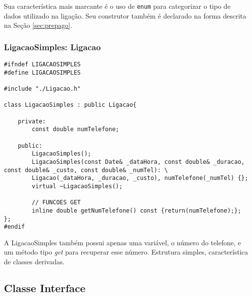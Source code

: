 Sua característica mais marcante é o uso de \texttt{enum} para categorizar o tipo de dados utilizado na ligação. Seu construtor também é declarado na forma descrita na Seção \ref{sec:prepago}. 

\subsubsection{LigacaoSimples: Ligacao} \label{sec:ligacaosimples}

\begin{lstlisting}[basicstyle=\tiny]
#ifndef LIGACAOSIMPLES
#define LIGACAOSIMPLES

#include "./Ligacao.h"

class LigacaoSimples : public Ligacao{

	private:   
		const double numTelefone;

	public:
		LigacaoSimples();
		LigacaoSimples(const Date& _dataHora, const double& _duracao, const double& _custo, const double& _numTel): \
		Ligacao(_dataHora, _duracao, _custo), numTelefone(_numTel) {};
		virtual ~LigacaoSimples();
		
		// FUNCOES GET
		inline double getNumTelefone() const {return(numTelefone);};
};
#endif
\end{lstlisting}

A LigacaoSimples também possui apenas uma variável, o número do telefone, e um método tipo \textit{get} para recuperar esse número. Estrutura simples, característica de classes derivadas.

\pagebreak

\subsection{Classe Interface} \label{sec:interface}

